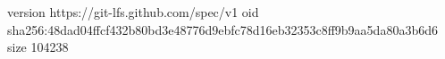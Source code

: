 version https://git-lfs.github.com/spec/v1
oid sha256:48dad04ffcf432b80bd3e48776d9ebfc78d16eb32353c8ff9b9aa5da80a3b6d6
size 104238
